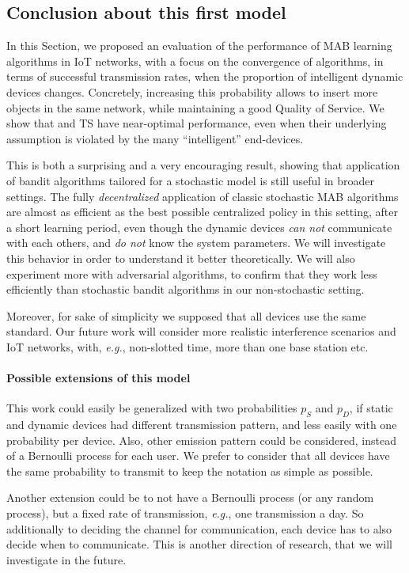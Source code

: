 \subsection{Conclusion about this first model}\label{sub:41:conclusion}

In this Section, we proposed an evaluation of the performance of MAB learning algorithms in IoT networks,
with a focus on the convergence of algorithms, in terms of successful transmission rates, when the proportion of intelligent dynamic devices changes.
Concretely, increasing this probability allows to insert more objects in the same network, while maintaining a good Quality of Service.
We show that \UCB{} and TS have near-optimal performance, even when their underlying \iid{} assumption is violated by the many ``intelligent'' end-devices.

This is both a surprising and a very encouraging result, showing that application of bandit algorithms tailored for a stochastic model is still useful in broader settings.
The fully \emph{decentralized} application of classic stochastic MAB algorithms are almost as efficient as the best possible centralized policy in this setting, after a short learning period, even though the dynamic devices \emph{can not} communicate with each others, and \emph{do not} know the system parameters.
We will investigate this behavior in order to understand it better theoretically.
We will also experiment more with adversarial algorithms, to confirm that they work less efficiently than stochastic bandit algorithms in our non-stochastic setting.

Moreover, for sake of simplicity we supposed that all devices use the same standard. Our future work will consider more realistic interference scenarios and IoT networks, with, \emph{e.g.}, non-slotted time, more than one base station etc.


\paragraph{Possible extensions of this model}
%
This work could easily be generalized with two probabilities $p_S$ and $p_D$, if static and dynamic devices had different transmission pattern, and less easily with one probability per device. Also, other emission pattern could be considered, instead of a Bernoulli process for each user.
We prefer to consider that all devices have the same probability to transmit to keep the notation as simple as possible.

Another extension could be to not have a Bernoulli process (or any random process), but a fixed rate of transmission, \emph{e.g.}, one transmission a day.
So additionally to deciding the channel for communication, each device has to also decide when to communicate.
This is another direction of research, that we will investigate in the future.



